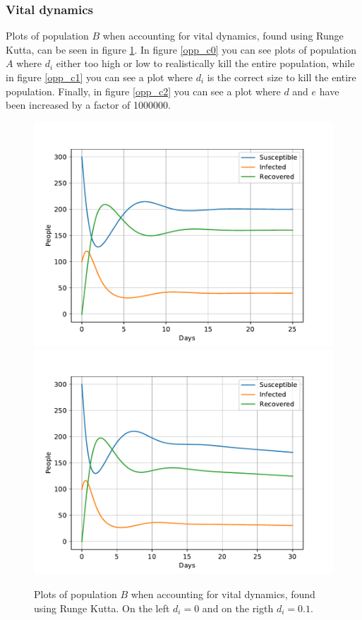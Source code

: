 \documentclass[a4paper]{article}
\let\Oldsubsubsection\subsubsection
\renewcommand{\subsubsection}{\FloatBarrier\Oldsubsubsection}
\begin{document}
	\subsubsection{Vital dynamics}
	
	Plots of population $B$ when accounting for vital dynamics, found using Runge Kutta, can be seen in figure \ref{opp_c0B}. In figure \ref{opp_c0} you can see plots of population $A$ where $d_i$ either too high or low to realistically kill the entire population, while in figure \ref{opp_c1} you can see a plot where $d_i$ is the correct size to kill the entire population. Finally, in figure \ref{opp_c2} you can see a plot where $d$ and $e$ have been increased by a factor of 1000000. 
	
	\begin{figure}[!htb]
		\centering 
		\includegraphics[scale=0.56]{../plots/opp_c_B0.pdf}
		\includegraphics[scale=0.56]{../plots/opp_c_B1.pdf}
		\caption{Plots of population $B$ when accounting for vital dynamics, found using Runge Kutta. On the left $d_i=0$ and on the rigth $d_i=0.1$.}
		\label{opp_c0B}
	\end{figure}
	
\end{document}
